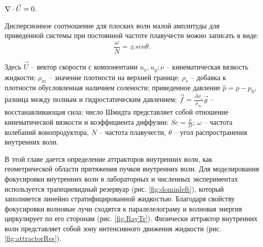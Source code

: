 \documentclass[utf8x]{G7-32} %
\begin{document}
\centerline{
  $
 \large \nabla \cdot \vec U  = 0
 \label{eq:contClassic}
 $.
}

\noindent Дисперсионное соотношение для плоских волн малой амплитуды для приведенной системы при постоянной частоте плавучести можно записать в виде:
  $$
    \frac{\omega}{N} = \pm sin \theta.
    \label{eq:dispersion}
  $$

\noindent Здесь $\vec{U}$ -- вектор скорости с компонентами $u_x,u_y; \nu$ -- кинематическая вязкость жидкости; $\rho_m$ -- значение плотности на верхней границе; $\rho_s$ -- добавка к плотности обусловленная наличием солености; приведенное давление $\hat{p}=p-p_0$, разница между полным и гидростатическим давлением; $\vec{f}=\frac{\Delta \rho_s}{\rho_m} \vec{g}$ -- восстанавливающая сила; число Шмидта представляет собой отношение кинематической вязкости и коэффициента диффузии:  $Sc = \frac{\nu}{D}$; $\omega$ -- частота колебаний вонопродуктора, $N$ -- частота плавучести, $\theta$ -- угол распространения внутренних волн. 

В этой главе дается определение аттракторов внутренних волн, как геометрической области притяжения пучков внутренних волн. 
Для моделирования фокусировки внутренних волн в лабораторных и численных экспериментах используется трапециевидный резервуар (рис. \ref{fig:dominleft}), который заполняется линейно стратифицированной жидкостью.  Благодаря свойству фокусировки волновые лучи сходятся к паралелелограму и волновая энергия циркулирует по его сторонам (рис. \ref{fig:RayTr}). Физически аттрактор внутренних волн представляет собой зону интенсивного движения жидкости (рис. \ref{fig:attractorRes}).
\end{document}
